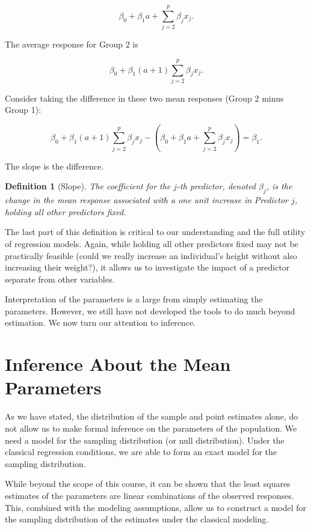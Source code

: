 \documentclass[
]{book}
\theoremstyle{plain}
\theoremstyle{mydefn}
\newtheorem{definition}{Definition}[chapter]
\theoremstyle{myexmpl}
\theoremstyle{remark}
\begin{document}
\[\beta_0 + \beta_1 a + \sum_{j=2}^{p} \beta_j x_j.\]

The average response for Group 2 is

\[\beta_0 + \beta_1 (a + 1) \sum_{j=2}^{p} \beta_j x_j.\]

Consider taking the difference in these two mean responses (Group 2 minus Group 1):

\[\beta_0 + \beta_1 (a + 1) \sum_{j=2}^{p} \beta_j x_j - \left(\beta_0 + \beta_1 a + \sum_{j=2}^{p} \beta_j x_j\right) = \beta_1.\]

The slope is the difference.

\begin{definition}[Slope]
The coefficient for the \(j\)-th predictor, denoted \(\beta_j\), is the change in the mean response associated with a one unit increase in Predictor \(j\), \emph{holding all other predictors fixed}.
\end{definition}

The last part of this definition is critical to our understanding and the full utility of regression models. Again, while holding all other predictors fixed may not be practically feasible (could we really increase an individual's height without also increasing their weight?), it allows us to investigate the impact of a predictor separate from other variables.

Interpretation of the parameters is a large from simply estimating the parameters. However, we still have not developed the tools to do much beyond estimation. We now turn our attention to inference.

\hypertarget{inference-about-the-mean-parameters}{%
\section{Inference About the Mean Parameters}\label{inference-about-the-mean-parameters}}

As we have stated, the distribution of the sample and point estimates alone, do not allow us to make formal inference on the parameters of the population. We need a model for the sampling distribution (or null distribution). Under the classical regression conditions, we are able to form an exact model for the sampling distribution.

While beyond the scope of this course, it can be shown that the least squares estimates of the parameters are linear combinations of the observed responses. This, combined with the modeling assumptions, allow us to construct a model for the sampling distribution of the estimates under the classical modeling.
\end{document}
